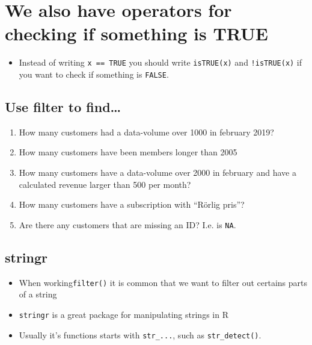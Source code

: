 \documentclass[]{book}
\providecommand{\tightlist}{%
  \setlength{\itemsep}{0pt}\setlength{\parskip}{0pt}}
\begin{document}
\hypertarget{we-also-have-operators-for-checking-if-something-is-true}{%
\section{We also have operators for checking if something is TRUE}\label{we-also-have-operators-for-checking-if-something-is-true}}

\begin{itemize}
\tightlist
\item
  Instead of writing \texttt{x\ ==\ TRUE} you should write \texttt{isTRUE(x)} and \texttt{!isTRUE(x)} if you want to check if something is \texttt{FALSE}.
\end{itemize}

\hypertarget{use-filter-to-find}{%
\subsection{Use filter to find\ldots{}}\label{use-filter-to-find}}

\begin{enumerate}
\def\labelenumi{\arabic{enumi}.}
\item
  How many customers had a data-volume over 1000 in february 2019?
\item
  How many customers have been members longer than 2005
\item
  How many customers have a data-volume over 2000 in february and have a calculated revenue larger than 500 per month?
\item
  How many customers have a subscription with ``Rörlig pris''?
\item
  Are there any customers that are missing an ID? I.e. is \texttt{NA}.
\end{enumerate}

\hypertarget{stringr}{%
\subsection{stringr}\label{stringr}}

\begin{itemize}
\tightlist
\item
  When working\texttt{filter()} it is common that we want to filter out certains parts of a string
\item
  \texttt{stringr} is a great package for manipulating strings in R
\item
  Usually it's functions starts with \texttt{str\_...}, such as \texttt{str\_detect()}.
\end{itemize}
\end{document}
